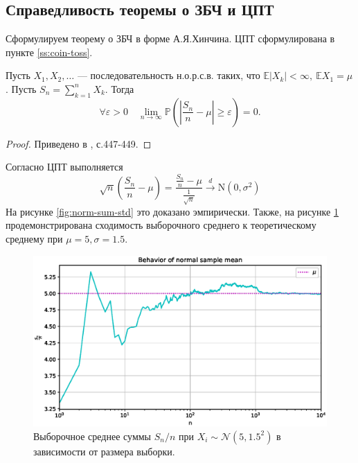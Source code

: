 \documentclass[11pt]{report}
\begin{document}
\subsection{Справедливость теоремы о ЗБЧ и ЦПТ}

Сформулируем теорему о ЗБЧ в форме А.Я.Хинчина. ЦПТ сформулирована в пункте \ref{ss:coin-toss}.

\begin{theorem}
Пусть $X_1,X_2,\dots$ --- последовательность н.о.р.с.в. таких, что $\mathbb{E}|X_k|<\infty,~\mathbb{E}X_1=\mu$.
Пусть $S_n = \sum_{k=1}^{n}X_k$. Тогда
$$
\forall\varepsilon>0\quad\lim_{n\to\infty}\mathbb{P}\left( \left|\dfrac{S_n}{n} - \mu\right| \geqslant \varepsilon \right) = 0.
$$
\end{theorem}
\begin{proof}
Приведено в \cite{shiryaev-1}, с.447-449.
\end{proof}

Согласно ЦПТ выполняется
$$
\sqrt{n}\left( \dfrac{S_n}{n}-\mu \right) = 
\dfrac{\frac{S_n}{n} - \mu}{\frac{1}{\sqrt{n}}} \stackrel{d}{\longrightarrow} \mathrm{N}(0,\sigma^2)
$$
На рисунке \ref{fig:norm-sum-std} это доказано эмпирически. Также, на рисунке \ref{fig:norm-sum-mean} продемонстрирована сходимость выборочного среднего к теоретическому среднему при $\mu=5, \sigma=1.5$.

\begin{figure}[H]
    \centering
    \includegraphics[width=0.85\linewidth]{images/norm-sum-mean.eps}
    \caption{Выборочное среднее суммы $S_n/n$ при $X_i\sim\mathcal{N}(5,1.5^2)$ в зависимости от размера выборки.}
    \label{fig:norm-sum-mean}
\end{figure}
\end{document}
